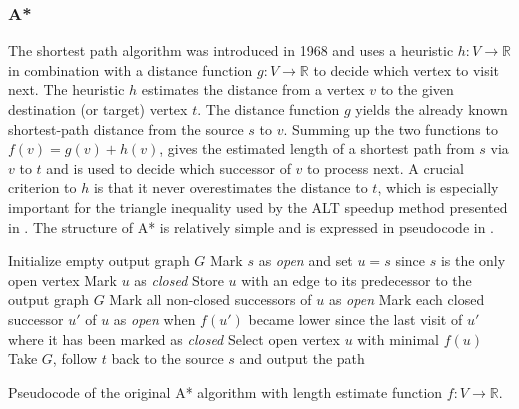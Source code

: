 		\subsubsection{A*}
		\label{subsubsec:astar}
		
			The  shortest path algorithm was introduced in 1968 and uses a heuristic $h : V \rightarrow \mathbb{R}$ in combination with a distance function $g : V \rightarrow \mathbb{R}$ to decide which vertex to visit next\cite{astar}.
			The heuristic $h$ estimates the distance from a vertex $v$ to the given destination (or target) vertex $t$.
			The distance function $g$ yields the already known shortest-path distance from the source $s$ to $v$.
			Summing up the two functions to $f(v) = g(v) + h(v)$, gives the estimated length of a shortest path from $s$ via $v$ to $t$ and is used to decide which successor of $v$ to process next.
			A crucial criterion to $h$ is that it never overestimates the distance to $t$, which is especially important for the triangle inequality used by the ALT speedup method presented in .
			The structure of A* is relatively simple and is expressed in pseudocode in .
			
			\begin{algorithm}[h]
				\begin{algorithmic}[1]
					\State Initialize empty output graph $G$
					\State Mark $s$ as \emph{open} and set $u = s$ since $s$ is the only open vertex
						\State Mark $u$ as \emph{closed}
						\State Store $u$ with an edge to its predecessor to the output graph $G$
						\State Mark all non-closed successors of $u$ as \emph{open} \label{alg:astar-open-1}
						\State Mark each closed successor $u'$ of $u$ as \emph{open} when $f(u')$ became lower since the last visit of $u'$ where it has been marked as \emph{closed} \label{alg:astar-open-2}
						\State Select open vertex $u$ with minimal $f(u)$
					\EndWhile
					\State Take $G$, follow $t$ back to the source $s$ and output the path
				\end{algorithmic}
				\caption{Pseudocode of the original A* algorithm\cite{astar} with length estimate function $f:V\rightarrow\mathbb{R}$.}
				\label{alg:astar}
			\end{algorithm}
			
